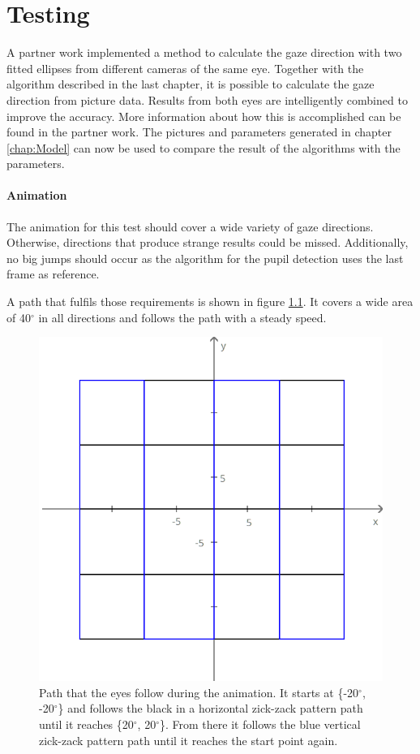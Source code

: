 \chapter{Testing}
\label{chap:results}

A partner work implemented a method to calculate the gaze direction with two fitted ellipses from different cameras of the same eye. Together with the algorithm described in the last chapter, it is possible to calculate the gaze direction from picture data. Results from both eyes are intelligently combined to improve the accuracy. More information about how this is accomplished can be found in the partner work\cite{bleuer}. The pictures and parameters generated in chapter \ref{chap:Model} can now be used to compare the result of the algorithms with the parameters.

\subsubsection{Animation}
\label{sec:animation}

The animation for this test should cover a wide variety of gaze directions. Otherwise, directions that produce strange results could be missed. Additionally, no big jumps should occur as the algorithm for the pupil detection uses the last frame as reference.

A path that fulfils those requirements is shown in figure \ref{fig:path}. It covers a wide area of 40$^{\circ}$ in all directions and follows the path with a steady speed.

\begin{figure} [H]
	\centering
	\includegraphics[width=0.4\linewidth]{images/grid.png}
	\caption{Path that the eyes follow during the animation. It starts at \{-20$^{\circ}$, -20$^{\circ}$\} and follows the black in a horizontal zick-zack pattern path until it reaches \{20$^{\circ}$, 20$^{\circ}$\}. From there it follows the blue vertical zick-zack pattern path until it reaches the start point again. }
	\label{fig:path}	
\end{figure}

